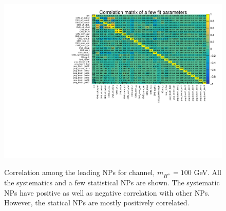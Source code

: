 \begin{figure}
\centering
{\includegraphics[width=1.0\textwidth]{Image/PostFit/CorelationNP.pdf}}
\caption{Correlation among the leading NPs for \ljets channel, $m_{H^+} = 100$ GeV. All the systematics and a few statistical NPs are shown. The systematic
NPs have positive as well as negative correlation with other NPs. However, the
statical NPs are mostly positively correlated.}
\label{fig:CorelationNP}
\end{figure}
